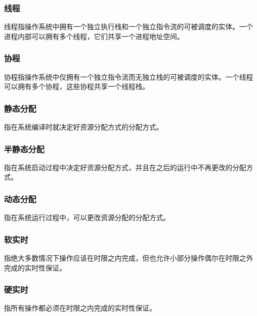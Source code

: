 \subsubsection{线程}\label{subsubsec:1-thread}

线程指操作系统中拥有一个独立执行栈和一个独立指令流的可被调度的实体。一个进程内部可以拥有多个线程，它们共享一个进程地址空间。

\subsubsection{协程}\label{subsubsec:1-coroutine}

协程指操作系统中仅拥有一个独立指令流而无独立栈的可被调度的实体。一个线程可以拥有多个协程，这些协程共享一个线程栈。

\subsubsection{静态分配}\label{subsubsec:1-static-allocation}

指在系统编译时就决定好资源分配方式的分配方式。

\subsubsection{半静态分配}\label{subsubsec:1-semi-static-allocation}

指在系统启动过程中决定好资源分配方式，并且在之后的运行中不再更改的分配方式。

\subsubsection{动态分配}\label{subsubsec:1-dynamic-allocation}

指在系统运行过程中，可以更改资源分配的分配方式。

\subsubsection{软实时}\label{subsubsec:1-soft-real-time}

指绝大多数情况下操作应该在时限之内完成，但也允许小部分操作偶尔在时限之外完成的实时性保证。

\subsubsection{硬实时}\label{subsubsec:1-hard-real-time}

指所有操作都必须在时限之内完成的实时性保证。

